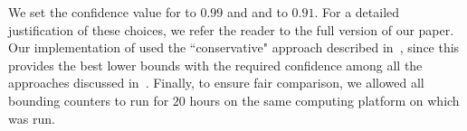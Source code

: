 %
%
%
%
We set the confidence value for {\MiniCount} to $0.99$ and {\SampleCount} and {\HybridMBound} to $0.91$. For a detailed 
justification of these choices, we refer the reader to the full version of our paper.
%
%
%
%
%
%
%
%
%
%
%
%
%
%
%
%
%
%
%
%
%
%
%
%
%
Our implementation of {\HybridMBound} used the ``conservative"
approach described in~\cite{gomes2006model}, since this provides the
best lower bounds with the required confidence among all the
approaches discussed in~\cite{gomes2006model}.  Finally, to ensure
fair comparison, we allowed all bounding counters to run for $20$
hours on the same computing platform on which {\ApproxMC} was run.
\vspace*{-.15in}
